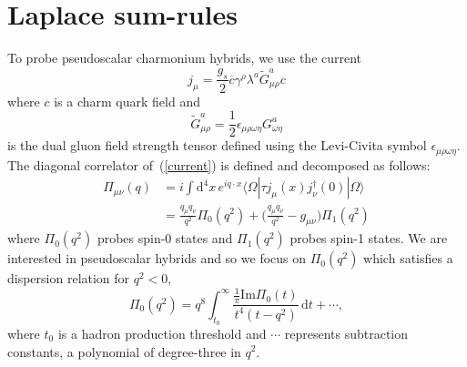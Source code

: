 \documentclass[12pt, letterpaper]{article}
\renewcommand{\Im}{\mathrm{Im}}
\newcommand{\dfourx}{\mathrm{d}^4 x}
\newcommand{\dt}{\mathrm{d}t}
\begin{document}
\section{Laplace sum-rules}\label{lsrs}
%
To probe pseudoscalar charmonium hybrids, we use the current~\cite{Govaerts:1985fx}
\begin{equation}\label{current}
  j_{\mu} = \frac{g_s}{2} \overline{c} \gamma^{\rho}\lambda^a \tilde{G}^a_{\mu\rho}c
\end{equation}
where $c$ is a charm quark field and
\begin{equation}
  \tilde{G}^a_{\mu\rho}=\frac{1}{2}\epsilon_{\mu\rho\omega\eta}G^a_{\omega\eta}
\end{equation}
is the dual gluon field strength tensor defined using the Levi-Civita symbol
$\epsilon_{\mu\rho\omega\eta}$.
The diagonal correlator of~(\ref{current}) is defined and decomposed as follows:
\begin{align}\label{correlator}
  \Pi_{\mu\nu}(q) & = i\int\!\dfourx\, e^{iq\cdot x} \langle\Omega| \tau j_{\mu}(x) j_{\nu}^{\dagger}(0) 
    |\Omega\rangle\\
    & = \frac{q_{\mu}q_{\nu}}{q^2}\Pi_0(q^2) + \bigg(\frac{q_{\mu}q_{\nu}}{q^2}-g_{\mu\nu}\bigg)\Pi_1(q^2) \label{decomposition}
\end{align}
where $\Pi_0(q^2)$ probes spin-0 states and $\Pi_1(q^2)$ probes spin-1 states. 
We are interested in pseudoscalar hybrids and so we focus on
$\Pi_0(q^2)$ which satisfies a dispersion relation for $q^2<0$,
\begin{equation}\label{dispersion}
  \Pi_0(q^2) = q^8\int_{t_0}^{\infty}\!\frac{\frac{1}{\pi}\Im\Pi_0(t)}{t^4(t-q^2)}\,\dt + \cdots,
\end{equation}
where $t_0$ is a hadron production threshold
and $\cdots$ represents subtraction constants, a polynomial of degree-three in $q^2$.
\end{document}
